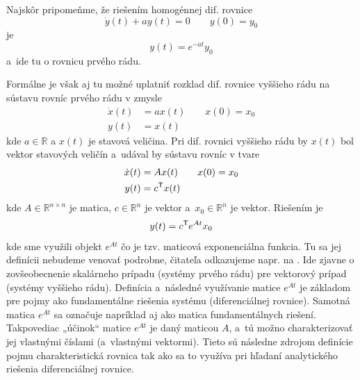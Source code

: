 \documentclass[a4paper, 10pt, ]{article}
\begin{document}
Najskôr pripomeňme, že riešením homogénnej dif. rovnice 
\begin{equation}
    \dot y(t) + a y(t) = 0 \qquad y(0) = y_0
\end{equation}
je
\begin{equation}
    y(t) =  e^{-a t} y_0
\end{equation}
a~ide tu o rovnicu prvého rádu. 

Formálne je však aj tu možné uplatniť rozklad dif. rovnice vyššieho rádu na sústavu rovníc prvého rádu v zmysle
\begin{subequations}
    \begin{align}
        \dot x(t) &= a x(t) \qquad x(0) = x_0 \\
        y(t) &= x(t)
    \end{align}    
\end{subequations}
kde $a \in \mathbb{R}$ a $x(t)$ je stavová veličina. Pri dif. rovnici vyššieho rádu by $x(t)$ bol vektor stavových veličín a~udával by sústavu rovníc v tvare
\begin{subequations}
    \begin{align}
        \dot x(t) &= A x(t) \qquad x(0) = x_0  \\
        y(t) &= c^{\mathsf{T}} x(t)
    \end{align}    
\end{subequations}
kde $A \in \mathbb{R}^{n\times n} $ je matica, $c \in \mathbb{R}^{n}$ je vektor a~$x_0 \in \mathbb{R}^{n}$ je vektor. Riešením je
\begin{equation}
    y(t) = c^{\mathsf{T}} e^{A t} x_0
\end{equation}
kde sme využili objekt $e^{At}$ čo je tzv. maticová exponenciálna funkcia. Tu sa jej definícii nebudeme venovať podrobne, čitateľa odkazujeme napr. na \cite{Aastroem2020}. Ide zjavne o zovšeobecnenie skalárneho prípadu (systémy prvého rádu) pre vektorový prípad (systémy vyššieho rádu). Definícia a~následné využívanie matice $e^{At}$ je základom pre pojmy ako fundamentálne riešenia systému (diferenciálnej rovnice). Samotná matica $e^{At}$ sa označuje napríklad aj ako matica fundamentálnych riešení. Takpovediac „účinok“ matice $e^{At}$ je daný maticou $A$, a~tú možno charakterizovať jej vlastnými číslami (a~vlastnými vektormi). Tieto sú následne zdrojom definície pojmu charakteristická rovnica tak ako sa to využíva pri hľadaní analytického riešenia diferenciálnej rovnice.
\end{document}
